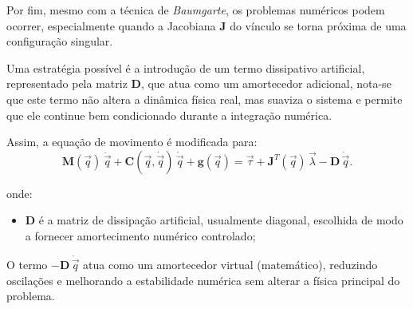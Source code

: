Por fim, mesmo com a técnica de \emph{Baumgarte}, os problemas numéricos podem ocorrer, 
especialmente quando a Jacobiana $\mathbf{J}$ do vínculo se torna próxima de uma configuração singular. 

Uma estratégia possível é a introdução de um termo dissipativo artificial, representado pela matriz 
$\mathbf{D}$, que atua como um amortecedor adicional, nota-se que este termo não altera a dinâmica física real, mas suaviza o sistema e permite que ele continue bem condicionado durante a integração numérica.

Assim, a equação de movimento é modificada para:
\begin{equation}
\mathbf{M}(\vec{q})\,\ddot{\vec{q}} 
+ \mathbf{C}(\vec{q},\dot{\vec{q}})\,\dot{\vec{q}} 
+ \mathbf{g}(\vec{q}) 
= \vec{\tau} 
+ \mathbf{J}^T(\vec{q}) \,\vec{\lambda} 
- \mathbf{D}\,\dot{\vec{q}}.
\end{equation}

onde:
\begin{itemize}
    \item $\mathbf{D}$ é a matriz de dissipação artificial, usualmente diagonal, 
          escolhida de modo a fornecer amortecimento numérico controlado;
\end{itemize}

O termo $-\mathbf{D}\,\dot{\vec{q}}$ atua como um amortecedor virtual (matemático), reduzindo oscilações e melhorando a estabilidade numérica sem alterar a física principal do problema.



